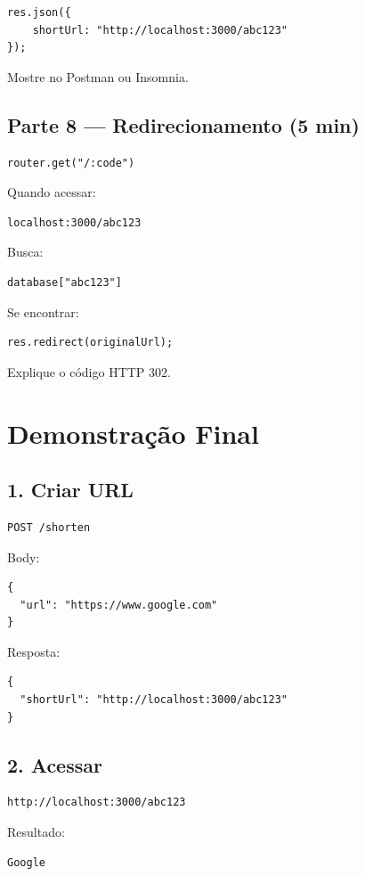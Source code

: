 \documentclass[a4paper,12pt]{article}
\begin{document}
\begin{verbatim}
res.json({
    shortUrl: "http://localhost:3000/abc123"
});
\end{verbatim}

Mostre no Postman ou Insomnia.

\subsection{Parte 8 --- Redirecionamento (5 min)}

\begin{verbatim}
router.get("/:code")
\end{verbatim}

Quando acessar:

\begin{verbatim}
localhost:3000/abc123
\end{verbatim}

Busca:

\begin{verbatim}
database["abc123"]
\end{verbatim}

Se encontrar:

\begin{verbatim}
res.redirect(originalUrl);
\end{verbatim}

Explique o código HTTP 302.

\section{Demonstração Final}

\subsection{1. Criar URL}

\begin{verbatim}
POST /shorten
\end{verbatim}

Body:

\begin{verbatim}
{
  "url": "https://www.google.com"
}
\end{verbatim}

Resposta:

\begin{verbatim}
{
  "shortUrl": "http://localhost:3000/abc123"
}
\end{verbatim}

\subsection{2. Acessar}

\begin{verbatim}
http://localhost:3000/abc123
\end{verbatim}

Resultado:

\begin{verbatim}
Google
\end{verbatim}
\end{document}
